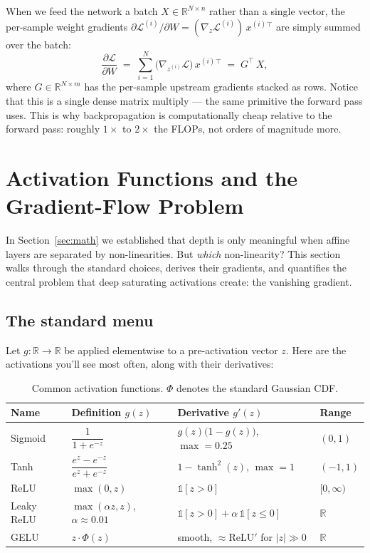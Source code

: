 \documentclass[11pt, a4paper]{article}
\let\oldsection\section
\renewcommand{\section}{\clearpage\oldsection}
\newcommand{\R}{\mathbb{R}}
\newcommand{\T}{^{\!\top}}
\newcommand{\Loss}{\mathcal{L}}
\begin{document}
When we feed the network a batch $X \in \R^{N \times n}$ rather than a single vector, the per-sample weight gradients $\partial \Loss^{(i)} / \partial W = (\nabla_z \Loss^{(i)})\, x^{(i)}{}\T$ are simply summed over the batch:
\begin{equation}
    \frac{\partial \Loss}{\partial W} \;=\; \sum_{i=1}^N \bigl(\nabla_{z^{(i)}} \Loss\bigr)\, x^{(i)}{}\T \;=\; G\T\, X,
\end{equation}
where $G \in \R^{N \times m}$ has the per-sample upstream gradients stacked as rows. Notice that this is a single dense matrix multiply --- the same primitive the forward pass uses. This is why backpropagation is computationally cheap relative to the forward pass: roughly $1\times$ to $2\times$ the FLOPs, not orders of magnitude more.

\section{Activation Functions and the Gradient-Flow Problem}
\label{sec:activations}

In Section~\ref{sec:math} we established that depth is only meaningful when affine layers are separated by non-linearities. But \emph{which} non-linearity? This section walks through the standard choices, derives their gradients, and quantifies the central problem that deep saturating activations create: the vanishing gradient.

\subsection{The standard menu}

Let $g: \R \to \R$ be applied elementwise to a pre-activation vector $z$. Here are the activations you'll see most often, along with their derivatives:

\begin{table}[H]
\centering
\small
\renewcommand{\arraystretch}{1.5}
\begin{tabular}{@{}l l l l@{}}
    \toprule
    \textbf{Name} & \textbf{Definition $g(z)$} & \textbf{Derivative $g'(z)$} & \textbf{Range} \\
    \midrule
    Sigmoid & $\dfrac{1}{1+e^{-z}}$ & $g(z)\bigl(1 - g(z)\bigr)$, $\max = 0.25$ & $(0, 1)$ \\
    Tanh & $\dfrac{e^z - e^{-z}}{e^z + e^{-z}}$ & $1 - \tanh^2(z)$, $\max = 1$ & $(-1, 1)$ \\
    ReLU & $\max(0, z)$ & $\mathbb{1}[z > 0]$ & $[0, \infty)$ \\
    Leaky ReLU & $\max(\alpha z, z)$, $\alpha \approx 0.01$ & $\mathbb{1}[z > 0] + \alpha\,\mathbb{1}[z \le 0]$ & $\R$ \\
    GELU & $z \cdot \Phi(z)$ & smooth, $\approx \mathrm{ReLU}'$ for $|z| \gg 0$ & $\R$ \\
    \bottomrule
\end{tabular}
\caption{Common activation functions. $\Phi$ denotes the standard Gaussian CDF.}
\end{table}
\end{document}
